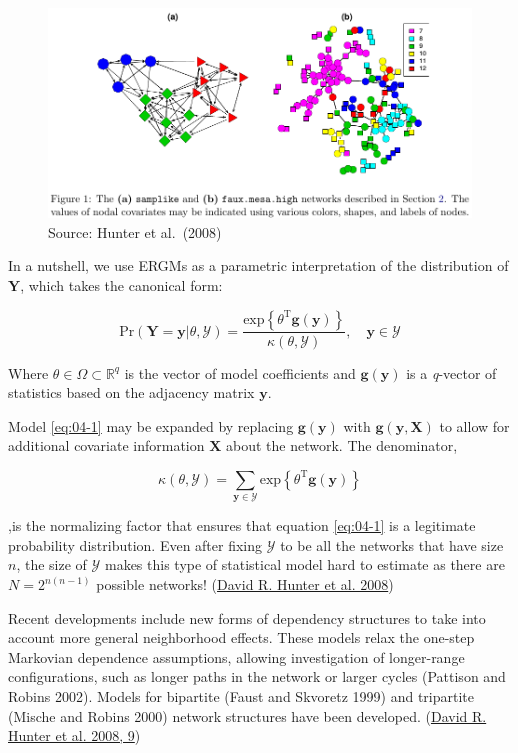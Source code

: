 \documentclass[
]{book}
\begin{document}
\begin{figure}
\centering
\includegraphics{hunter2008.png}
\caption{Source: Hunter et al.~(2008)}
\end{figure}

In a nutshell, we use ERGMs as a parametric interpretation of the distribution of \(\mathbf{Y}\), which takes the canonical form:

\[
\mbox{Pr}\left(\mathbf{Y}=\mathbf{y}|\theta, \mathcal{Y}\right) = \frac{\mbox{exp}\left\{\theta^{\mbox{T}}\mathbf{g}(\mathbf{y})\right\}}{\kappa\left(\theta, \mathcal{Y}\right)},\quad\mathbf{y}\in\mathcal{Y}
\label{eq:04-1}
\]

Where \(\theta\in\Omega\subset\mathbb{R}^q\) is the vector of model coefficients and \(\mathbf{g}(\mathbf{y})\) is a \emph{q}-vector of statistics based on the adjacency matrix \(\mathbf{y}\).

Model \eqref{eq:04-1} may be expanded by replacing \(\mathbf{g}(\mathbf{y})\) with \(\mathbf{g}(\mathbf{y}, \mathbf{X})\) to allow for additional covariate information \(\mathbf{X}\) about the network. The denominator,

\[
\kappa\left(\theta,\mathcal{Y}\right) = \sum_{\mathbf{y}\in\mathcal{Y}}\mbox{exp}\left\{\theta^{\mbox{T}}\mathbf{g}(\mathbf{y})\right\}
\]

,is the normalizing factor that ensures that equation \eqref{eq:04-1} is a legitimate probability distribution. Even after fixing \(\mathcal{Y}\) to be all the networks that have size \(n\), the size of \(\mathcal{Y}\) makes this type of statistical model hard to estimate as there are \(N = 2^{n(n-1)}\) possible networks! (\protect\hyperlink{ref-Hunter2008}{David R. Hunter et al. 2008})

Recent developments include new forms of dependency structures to take into account more general neighborhood effects. These models relax the one-step Markovian dependence assumptions, allowing investigation of longer-range configurations, such as longer paths in the network or larger cycles (Pattison and Robins 2002). Models for bipartite (Faust and Skvoretz 1999) and tripartite (Mische and Robins 2000) network structures have been developed. (\protect\hyperlink{ref-Hunter2008}{David R. Hunter et al. 2008, 9})
\end{document}
